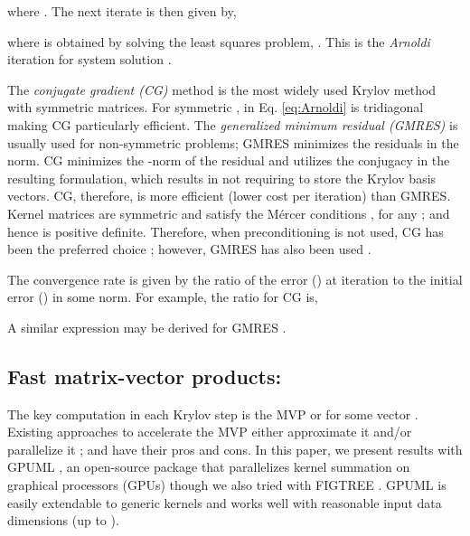 \documentclass[10pt,journal,letterpaper,compsoc]{IEEEtran}
\begin{document}
where . The next iterate  is then given by,

where  is obtained by solving the least squares problem, . This is the \emph{Arnoldi} iteration for system solution \cite{SaadIterativeMethods}.

The \emph{conjugate gradient (CG)} method is the most widely used Krylov method with symmetric matrices. For symmetric ,  in Eq. \ref{eq:Arnoldi} is tridiagonal making CG particularly efficient. The \emph{generalized minimum residual (GMRES)} is usually used for non-symmetric problems; GMRES minimizes the residuals  in the norm. CG minimizes the -norm of the residual and utilizes the conjugacy in the resulting formulation, which results in not requiring to store the Krylov basis vectors. CG, therefore, is more efficient (lower cost per iteration) than GMRES. Kernel matrices are symmetric and satisfy the M\'ercer conditions , for any ; and hence  is positive definite. Therefore, when preconditioning is not used, CG has been the preferred choice \cite{GPML_Mackay}; however, GMRES has also been used \cite{NandoKrylov}.

The convergence rate is given by the ratio of the error () at  iteration to the initial error () in some norm. For example, the ratio for CG \cite{SaadIterativeMethods} is,
 
 A similar expression may be derived for GMRES \cite{SaadIterativeMethods}.

\subsection{Fast matrix-vector products: }
The key computation in each Krylov step is the MVP  or  for some vector . Existing approaches to accelerate the MVP either approximate it \cite{IFGT_Yang,IFGT_Raykar,DualTree,FIGTREE} and/or parallelize it \cite{GPUML}; and have their pros and cons. In this paper, we present results with GPUML \cite{GPUML}, an open-source package that parallelizes kernel summation on graphical processors (GPUs) though we also tried with FIGTREE \cite{FIGTREE}. GPUML is easily extendable to generic kernels and works well with reasonable input data dimensions (up to ).
\end{document}
